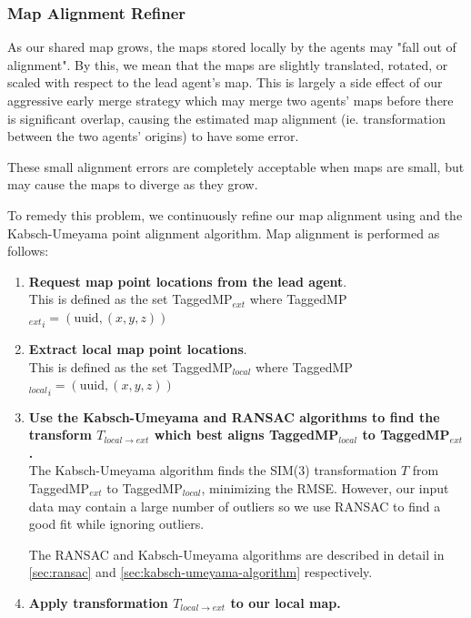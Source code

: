\subsubsection{Map Alignment Refiner}
\label{sec:map-alignment-refiner}
As our shared map grows, the maps stored locally by the agents may "fall out of alignment". By this, we mean that the maps are slightly translated, rotated, or scaled with respect to the lead agent's map. This is largely a side effect of our aggressive early merge strategy which may merge two agents' maps before there is significant overlap, causing the estimated map alignment (ie. transformation between the two agents' origins) to have some error.

These small alignment errors are completely acceptable when maps are small, but may cause the maps to diverge as they grow.

To remedy this problem, we continuously refine our map alignment using  and the Kabsch-Umeyama point alignment algorithm. Map alignment is performed as follows:

\begin{enumerate}
    \item \textbf{Request map point locations from the lead agent}. \\
          This is defined as the set TaggedMP$_{ext}$ where TaggedMP${_{ext}}_i = (\text{uuid}, (x, y, z))$
    \item \textbf{Extract local map point locations}. \\
          This is defined as the set TaggedMP$_{local}$ where TaggedMP${_{local}}_i = (\text{uuid}, (x, y, z))$
    \item \textbf{Use the Kabsch-Umeyama and RANSAC algorithms to find the transform $T_{local \to ext}$ which best aligns TaggedMP$_{local}$ to TaggedMP$_{ext}$.} \\
          The Kabsch-Umeyama algorithm finds the SIM(3) transformation $T$ from TaggedMP$_{ext}$ to TaggedMP$_{local}$, minimizing the RMSE. However, our input data may contain a large number of outliers so we use RANSAC to find a good fit while ignoring outliers.

          The RANSAC and Kabsch-Umeyama algorithms are described in detail in \autoref{sec:ransac} and \autoref{sec:kabsch-umeyama-algorithm} respectively.
    \item \textbf{Apply transformation $T_{local \to ext}$ to our local map.}
\end{enumerate}

